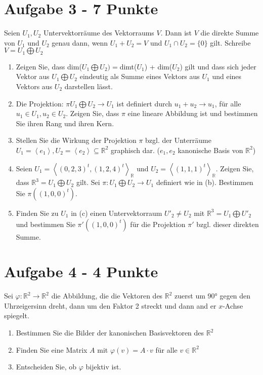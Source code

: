 \documentclass[a4paper]{article}
\begin{document}
\section*{Aufgabe 3 - 7 Punkte}
Seien $U_1, U_2$ Untervektorräume des Vektorraums $V$. Dann ist $V$ die direkte Summe von $U_1$ und $U_2$ genau dann, wenn $U_1 + U_2 = V$ und $U_1 \cap U_2 = \{0\}$ gilt. 
Schreibe $V = U_1 \bigoplus U_2$
  \begin{enumerate}[label=(\alph*)]
\item Zeigen Sie, dass dim($U_1 \bigoplus U_2) =$dimt($U_1$) + dim($U_2$) gilt und dass sich jeder Vektor aus $U_1 \bigoplus U_2$ eindeutig als Summe eines Vektors aus $U_1$ und eines Vektors aus $U_2$ darstellen lässt.
\item Die Projektion: $\pi U_1 \bigoplus U_2 \rightarrow U_1$ ist definiert durch $u_1 + u_2 \rightarrow u_1$, für alle $u_1 \in U_1, u_2 \in U_2$. Zeigen Sie, dass $\pi$ eine lineare Abbildung ist und bestimmen Sie ihren Rang und ihren Kern.
\item Stellen Sie die Wirkung der Projektion $\pi$ bzgl. der Unterräume $U_1 = \left\langle e_1 \right\rangle, U_2 = \left\langle e_2 \right\rangle \subseteq \mathbb{R}^2$ graphisch dar. ($e_1,e_2$ kanonische Basis von $\mathbb{R}^2$)
\item Seien $U_1 = \left\langle (0,2,3)^t, (1,2,4)^t \right\rangle_\mathbb{R}$ und $U_2 = \left\langle (1,1,1)^t \right\rangle_\mathbb{R}$. Zeigen Sie, dass $\mathbb{R}^3 = U_1 \bigoplus U_2$ gilt. Sei $\pi: U_1 \bigoplus U_2 \rightarrow U_1$ definiert wie in (b). Bestimmen Sie $\pi ((1,0,0)^t)$.
\item Finden Sie zu $U_1$ in (c) einen Untervektorraum $U'_2 \neq U_2$ mit $\mathbb{R}^3 = U_1 \bigoplus U'_2$ und bestimmen Sie $\pi' ((1,0,0)^t)$ für die Projektion $\pi'$ bzgl. dieser direkten Summe.
 \end{enumerate}


\section*{Aufgabe 4 - 4 Punkte}
Sei $\varphi: \mathbb{R}^2 \rightarrow \mathbb{R}^2$ die Abbildung, die die Vektoren des $\mathbb{R}^2$ zuerst um 90° gegen den Uhrzeigersinn dreht, dann um den Faktor 2 streckt und dann and er $x$-Achse spiegelt.

  \begin{enumerate}[label=(\alph*)]
  \item Bestimmen Sie die Bilder der kanonischen Basisvektoren des $\mathbb{R}^2$

  \item Finden Sie eine Matrix $A$ mit $\varphi(v) = A \cdot v$ für alle $v \in \mathbb{R}^2$
  
  \item Entscheiden Sie, ob $\varphi$ bijektiv ist.
  
  \end{enumerate}
 
\end{document}
